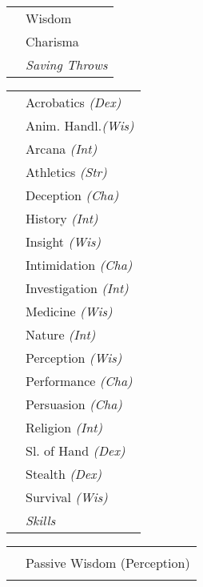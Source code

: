 \documentclass{article}
\begin{document}
\begin{minipage}{.3\textwidth}
\begin{minipage}{.55\textwidth}
\begin{tabular}{|m{}m{}|}
      &Wisdom\\
      &Charisma\\
      &\textit{\footnotesize{Saving Throws}}\\\hline
    \end{tabular}
    \begin{tabular}{|m{}m{}|}
      \hline
      &Acrobatics \textit{\footnotesize{(Dex)}}\\
      &Anim. Handl.\textit{\footnotesize{(Wis)}}\\
      &Arcana \textit{\footnotesize{(Int)}}\\
      &Athletics \textit{\footnotesize{(Str)}}\\
      &Deception \textit{\footnotesize{(Cha)}}\\
      &History \textit{\footnotesize{(Int)}}\\
      &Insight \textit{\footnotesize{(Wis)}}\\
      &Intimidation \textit{\footnotesize{(Cha)}}\\
      &Investigation \textit{\footnotesize{(Int)}}\\
      &Medicine \textit{\footnotesize{(Wis)}}\\
      &Nature \textit{\footnotesize{(Int)}}\\
      &Perception \textit{\footnotesize{(Wis)}}\\
      &Performance \textit{\footnotesize{(Cha)}}\\
      &Persuasion \textit{\footnotesize{(Cha)}}\\
      &Religion \textit{\footnotesize{(Int)}}\\
      &Sl. of Hand \textit{\footnotesize{(Dex)}}\\
      &Stealth \textit{\footnotesize{(Dex)}}\\
      &Survival \textit{\footnotesize{(Wis)}}\\
      &\textit{\footnotesize{Skills}}\\\hline
    \end{tabular}
  \vspace{2em}
  \end{minipage}
   \begin{tabular}{|m{}|m{}|}
     \hline
     &\\
     &Passive Wisdom (Perception)\\
     &\\\hline
   \end{tabular}


\end{minipage}
\end{document}
